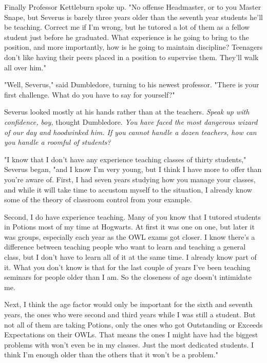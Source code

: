 Finally Professor Kettleburn spoke up. "No offense Headmaster, or to you Master Snape, but Severus is barely three years older than the seventh year students he'll be teaching. Correct me if I'm wrong, but he tutored a lot of them as a fellow student just before he graduated. What experience is he going to bring to the position, and more importantly, how is he going to maintain discipline? Teenagers don't like having their peers placed in a position to supervise them. They'll walk all over him."

"Well, Severus," said Dumbledore, turning to his newest professor. "There is your first challenge. What do you have to say for yourself?"

Severus looked mostly at his hands rather than at the teachers. \emph{Speak up with confidence, boy,} thought Dumbledore. \emph{You have faced the most dangerous wizard of our day and hoodwinked him. If you cannot handle a dozen teachers, how can you handle a roomful of students?}

"I know that I don't have any experience teaching classes of thirty students," Severus began, "and I know I'm very young, but I think I have more to offer than you're aware of. First, I had seven years studying how you manage your classes, and while it will take time to accustom myself to the situation, I already know some of the theory of classroom control from your example.

\textooquote Second, I do have experience teaching. Many of you know that I tutored students in Potions most of my time at Hogwarts. At first it was one on one, but later it was groups, especially each year as the OWL exams got closer. I know there's a difference between teaching people who want to learn and teaching a general class, but I don't have to learn all of it at the same time. I already know part of it. What you don't know is that for the last couple of years I've been teaching{\el} seminars for people older than I am. So the closeness of age doesn't intimidate me.

\textooquote Next, I think the age factor would only be important for the sixth and seventh years, the ones who were second and third years while I was still a student. But not all of them are taking Potions, only the ones who got Outstanding or Exceeds Expectations on their OWLs. That means the ones I might have had the biggest problems with won't even be in my classes. Just the most dedicated students. I think I'm enough older than the others that it won't be a problem."

